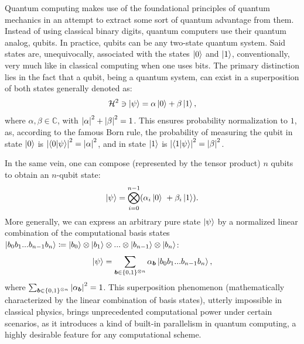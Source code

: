 Quantum computing makes use of the foundational principles of quantum mechanics in an attempt to extract some sort of quantum advantage from them. Instead of using classical binary digits, quantum computers use their quantum analog, qubits. In practice, qubits can be any two-state quantum system. Said states are, unequivocally, associated with the states $\ket{0}$ and $\ket{1}$, conventionally, very much like in classical computing when one uses bits. The primary distinction lies in the fact that a qubit, being a quantum system, can exist in a superposition of both states generally denoted as:
\begin{equation}
  \mathcal{H}^2 \ni \ket{\psi} = \alpha \ket{0} + \beta \ket{1},
\end{equation}
where $\alpha, \beta \in \mathbb{C}$, with $\abs{\alpha}^2 + \abs{\beta}^2 = 1$. This ensures probability normalization to $1$, as, according to the famous Born rule, the probability of measuring the qubit in state $\ket{0}$ is $\abs{\bra{0}\ket{\psi}}^2 = \abs{\alpha}^2$, and in state $\ket{1}$ is $\abs{\bra{1}\ket{\psi}}^2 = \abs{\beta}^2$.

In the same vein, one can compose (represented by the tensor product) $n$ qubits to obtain an $n$-qubit state:
\begin{equation}\label{eq:n_qubit_state}
  \ket{\psi}=\bigotimes_{i=0}^{n-1}(\alpha_{i}\ket{0}\ +\beta_{i}\ket{1}).
\end{equation}
More generally, we can express an arbitrary pure state $\ket{\psi}$ by a normalized linear combination of the computational basis states $\ket{b_0 b_1 ... b_{n-1} b_n} \coloneq \ket{b_0} \otimes \ket{b_1} \otimes ... \otimes \ket{b_{n-1}} \otimes \ket{b_n}$:
\begin{equation}\label{eq:general_n_qubit_state}
  \ket{\psi} = \sum_{\boldsymbol{b} \in \{0, 1\}^{\otimes n}} \alpha_{\boldsymbol{b}} \ket{b_0 b_1 ... b_{n-1} b_n},
\end{equation}
where $\sum_{\boldsymbol{b} \in \{0, 1\}^{\otimes n}} \abs{\alpha_{\boldsymbol{b}}}^2 = 1$. This superposition phenomenon (mathematically characterized by the linear combination of basis states), utterly impossible in classical physics, brings unprecedented computational power under certain scenarios, as it introduces a kind of built-in parallelism in quantum computing, a highly desirable feature for any computational scheme.

